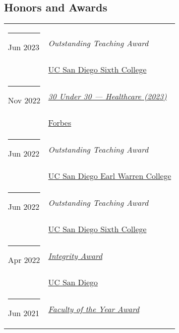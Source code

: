 \documentclass[margin,line]{res}
\begin{document}
\begin{resume}
\section{\sc Honors and Awards}
\begin{longtable}{@{}p{0.7in}p{4in}}
\hspace*{-4mm} \rule{-1mm}{5mm} Jun 2023 & \textit{Outstanding Teaching Award}\\*
\hspace*{-4mm} \hspace*{-4mm} & \hspace{4mm} \href{https://sixth.ucsd.edu/}{UC San Diego Sixth College}\\
\hspace*{-4mm} \rule{-1mm}{5mm} Nov 2022 & \href{https://www.forbes.com/profile/niema-moshiri}{\textit{30 Under 30 --- Healthcare (2023)}}\\*
\hspace*{-4mm} \hspace*{-4mm} & \hspace{4mm} \href{https://www.forbes.com/30-under-30/2023/healthcare/}{Forbes}\\
\hspace*{-4mm} \rule{-1mm}{5mm} Jun 2022 & \textit{Outstanding Teaching Award}\\*
\hspace*{-4mm} \hspace*{-4mm} & \hspace{4mm} \href{https://warren.ucsd.edu/}{UC San Diego Earl Warren College}\\
\hspace*{-4mm} \rule{-1mm}{5mm} Jun 2022 & \textit{Outstanding Teaching Award}\\*
\hspace*{-4mm} \hspace*{-4mm} & \hspace{4mm} \href{https://sixth.ucsd.edu/}{UC San Diego Sixth College}\\
\hspace*{-4mm} \rule{-1mm}{5mm} Apr 2022 & \href{https://academicintegrity.ucsd.edu/events/integrity-awards/index.html}{\textit{Integrity Award}}\\*
\hspace*{-4mm} \hspace*{-4mm} & \hspace{4mm} \href{https://www.ucsd.edu/}{UC San Diego}\\
\hspace*{-4mm} \rule{-1mm}{5mm} Jun 2021 & \href{https://tbp.ucsd.edu/home}{\textit{Faculty of the Year Award}}\\*

\end{longtable}
\end{resume}
\end{document}
